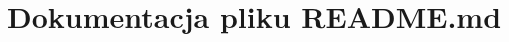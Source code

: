 \hypertarget{_r_e_a_d_m_e_8md}{\section{Dokumentacja pliku R\-E\-A\-D\-M\-E.\-md}
\label{_r_e_a_d_m_e_8md}
}
